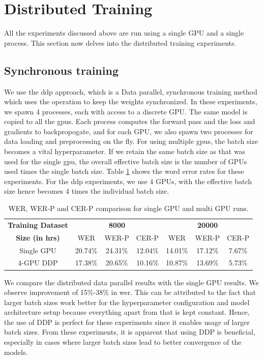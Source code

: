 \section{Distributed Training}
\label{section:res_dist}
All the experiments discussed above are run using a single GPU and a single process. This section now delves into the distributed training experiments. 

\subsection{Synchronous training}
We use the \acrfull{ddp} approach, which is a Data parallel, synchronous training method which uses the  operation to keep the weights synchronized. In these experiments, we spawn 4 processes, each with access to a discrete GPU. The same model is copied to all the \acrshort{gpu}s. Each process computes the forward pass and the loss and gradients to backpropogate, and for each GPU, we also spawn two processes for data loading and preprocessing on the fly. For using multiple \acrshort{gpu}s, the batch size becomes a vital hyperparameter. If we retain the same batch size as that was used for the single \acrshort{gpu}, the overall effective batch size is the number of GPUs used times the single batch size. Table \ref{table:wer_ddp} shows the word error rates for these experiments. For the \acrshort{ddp} experiments, we use 4 GPUs, with the effective batch size hence becomes 4 times the individual batch size. 

\begin{table}[ht]
\centering
\begin{tabular}{c | c c c | c c c }
\hline
\textbf{Training Dataset} & \multicolumn{3}{c|}{\textbf{8000}} & \multicolumn{3}{c}{\textbf{20000}}\\\cline{2-7}
   \textbf{Size (in hrs)} & WER & WER-P & CER-P & WER & WER-P & CER-P\\
 \hline
  Single GPU & 20.74\% & 24.31\% & 12.04\% & 14.01\% & 17.12\% & 7.67\%\\
  4-GPU DDP & 17.38\% & 20.65\% & 10.16\% & 10.87\% & 13.69\% & 5.73\% \\
 \hline
\end{tabular}
\caption{\label{table:wer_ddp} WER, WER-P and CER-P comparison for single GPU and multi GPU runs.}
\end{table}

We compare the distributed data parallel results with the single GPU results. We observe improvement of 15\%-38\% in \acrshort{wer}. This can be attributed to the fact that larger batch sizes work better for the hyperparameter configuration and model architecture setup because everything apart from that is kept constant. Hence, the use of DDP is perfect for these experiments since it enables usage of larger batch sizes. From these experiments, it is apparent that using DDP is beneficial, especially in cases where larger batch sizes lead to better convergence of the models. 


